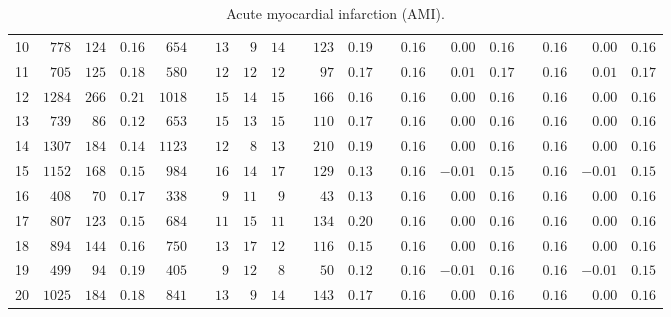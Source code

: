 \documentclass[]{article}\usepackage[]{graphicx}\usepackage[]{color}
\begin{document}
\begin{landscape}
\begin{table}[!tbp]
\begin{center}
\begin{tabular}{lrrrrcrrrcrrcrrrcrrr}
10&$ 778$&$124$&$0.16$&$ 654$&&$13$&$ 9$&$14$&&$123$&$0.19$&&$0.16$&$ 0.00$&$0.16$&&$0.16$&$ 0.00$&$0.16$\tabularnewline
11&$ 705$&$125$&$0.18$&$ 580$&&$12$&$12$&$12$&&$ 97$&$0.17$&&$0.16$&$ 0.01$&$0.17$&&$0.16$&$ 0.01$&$0.17$\tabularnewline
12&$1284$&$266$&$0.21$&$1018$&&$15$&$14$&$15$&&$166$&$0.16$&&$0.16$&$ 0.00$&$0.16$&&$0.16$&$ 0.00$&$0.16$\tabularnewline
13&$ 739$&$ 86$&$0.12$&$ 653$&&$15$&$13$&$15$&&$110$&$0.17$&&$0.16$&$ 0.00$&$0.16$&&$0.16$&$ 0.00$&$0.16$\tabularnewline
14&$1307$&$184$&$0.14$&$1123$&&$12$&$ 8$&$13$&&$210$&$0.19$&&$0.16$&$ 0.00$&$0.16$&&$0.16$&$ 0.00$&$0.16$\tabularnewline
15&$1152$&$168$&$0.15$&$ 984$&&$16$&$14$&$17$&&$129$&$0.13$&&$0.16$&$-0.01$&$0.15$&&$0.16$&$-0.01$&$0.15$\tabularnewline
16&$ 408$&$ 70$&$0.17$&$ 338$&&$ 9$&$11$&$ 9$&&$ 43$&$0.13$&&$0.16$&$ 0.00$&$0.16$&&$0.16$&$ 0.00$&$0.16$\tabularnewline
17&$ 807$&$123$&$0.15$&$ 684$&&$11$&$15$&$11$&&$134$&$0.20$&&$0.16$&$ 0.00$&$0.16$&&$0.16$&$ 0.00$&$0.16$\tabularnewline
18&$ 894$&$144$&$0.16$&$ 750$&&$13$&$17$&$12$&&$116$&$0.15$&&$0.16$&$ 0.00$&$0.16$&&$0.16$&$ 0.00$&$0.16$\tabularnewline
19&$ 499$&$ 94$&$0.19$&$ 405$&&$ 9$&$12$&$ 8$&&$ 50$&$0.12$&&$0.16$&$-0.01$&$0.16$&&$0.16$&$-0.01$&$0.15$\tabularnewline
20&$1025$&$184$&$0.18$&$ 841$&&$13$&$ 9$&$14$&&$143$&$0.17$&&$0.16$&$ 0.00$&$0.16$&&$0.16$&$ 0.00$&$0.16$\tabularnewline
\hline
\end{tabular}

\caption{Acute myocardial infarction (AMI).\label{round}}\end{center}

\end{table}



\end{landscape}
\end{document}
